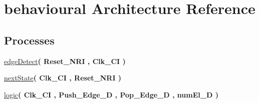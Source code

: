 \hypertarget{classFIFO_1_1behavioural}{}\section{behavioural Architecture Reference}
\label{classFIFO_1_1behavioural}
\subsection*{Processes}
 \begin{DoxyCompactItemize}
\item 
\mbox{\label{classFIFO_1_1behavioural_a8ddfdcf7d5753d2b8a763c46b1f66ede}} 
\hyperlink{classFIFO_1_1behavioural_a8ddfdcf7d5753d2b8a763c46b1f66ede}{edge\+Detect}{\bfseries  ( {\bfseries \textcolor{vhdlchar}{Reset\+\_\+\+N\+RI}\textcolor{vhdlchar}{ }} , {\bfseries \textcolor{vhdlchar}{Clk\+\_\+\+CI}\textcolor{vhdlchar}{ }} )}
\item 
\mbox{\label{classFIFO_1_1behavioural_a2992b29d9b0307a76d35ba519bd004f0}} 
\hyperlink{classFIFO_1_1behavioural_a2992b29d9b0307a76d35ba519bd004f0}{next\+State}{\bfseries  ( {\bfseries \textcolor{vhdlchar}{Clk\+\_\+\+CI}\textcolor{vhdlchar}{ }} , {\bfseries \textcolor{vhdlchar}{Reset\+\_\+\+N\+RI}\textcolor{vhdlchar}{ }} )}
\item 
\mbox{\label{classFIFO_1_1behavioural_a1ee20088690b6a085efcf212eeac4914}} 
\hyperlink{classFIFO_1_1behavioural_a1ee20088690b6a085efcf212eeac4914}{logic}{\bfseries  ( {\bfseries \textcolor{vhdlchar}{Clk\+\_\+\+CI}\textcolor{vhdlchar}{ }} , {\bfseries \textcolor{vhdlchar}{Push\+\_\+\+Edge\+\_\+D}\textcolor{vhdlchar}{ }} , {\bfseries \textcolor{vhdlchar}{Pop\+\_\+\+Edge\+\_\+D}\textcolor{vhdlchar}{ }} , {\bfseries \textcolor{vhdlchar}{num\+El\+\_\+D}\textcolor{vhdlchar}{ }} )}
\end{DoxyCompactItemize}
